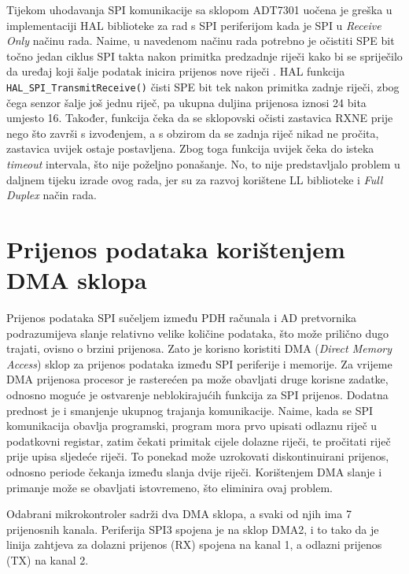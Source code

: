 		Tijekom uhodavanja SPI komunikacije sa sklopom ADT7301 uočena je greška u implementaciji HAL biblioteke za rad s SPI periferijom kada je SPI u \textit{Receive Only} načinu rada. Naime, u navedenom načinu rada potrebno je očistiti SPE bit točno jedan ciklus SPI takta nakon primitka predzadnje riječi kako bi se spriječilo da uređaj koji šalje podatak inicira prijenos nove riječi \cite[str.~894]{stm32f4_manual}. HAL funkcija \texttt{HAL\_SPI\_TransmitReceive()} čisti SPE bit tek nakon primitka zadnje riječi, zbog čega senzor šalje još jednu riječ, pa ukupna duljina prijenosa iznosi 24 bita umjesto 16. Također, funkcija čeka da se sklopovski očisti zastavica RXNE prije nego što završi s izvođenjem, a s obzirom da se zadnja riječ nikad ne pročita, zastavica uvijek ostaje postavljena. Zbog toga funkcija uvijek čeka do isteka \textit{timeout} intervala, što nije poželjno ponašanje. No, to nije predstavljalo problem u daljnem tijeku izrade ovog rada, jer su za razvoj korištene LL biblioteke i \textit{Full Duplex} način rada.
		
	\section{Prijenos podataka korištenjem DMA sklopa}
		
		Prijenos podataka SPI sučeljem između PDH računala i AD pretvornika podrazumijeva slanje relativno velike količine podataka, što može prilično dugo trajati, ovisno o brzini prijenosa. Zato je korisno koristiti DMA (\textit{Direct Memory Access}) sklop za prijenos podataka između SPI periferije i memorije. Za vrijeme DMA prijenosa procesor je rasterećen pa može obavljati druge korisne zadatke, odnosno moguće je ostvarenje neblokirajućih funkcija za SPI prijenos. Dodatna prednost je i smanjenje ukupnog trajanja komunikacije. Naime, kada se SPI komunikacija obavlja programski, program mora prvo upisati odlaznu riječ u podatkovni registar, zatim čekati primitak cijele dolazne riječi, te pročitati riječ prije upisa sljedeće riječi. To ponekad može uzrokovati diskontinuirani prijenos, odnosno periode čekanja između slanja dvije riječi. \cite[str.~890]{stm32f4_manual} Korištenjem DMA slanje i primanje može se obavljati istovremeno, što eliminira ovaj problem.
		
		Odabrani mikrokontroler sadrži dva DMA sklopa, a svaki od njih ima 7 prijenosnih kanala. Periferija SPI3 spojena je na sklop DMA2, i to tako da je linija zahtjeva za dolazni prijenos (RX) spojena na kanal 1, a odlazni prijenos (TX) na kanal 2. 
		
